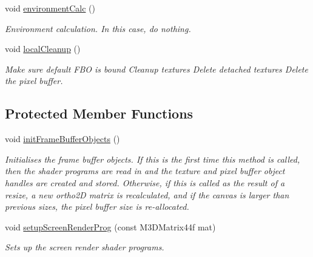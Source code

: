 \begin{DoxyCompactItemize}
void \hyperlink{class_screen_repaint_a983641dc820e4eabfb1e6b9a9966d82b}{environment\-Calc} ()
\begin{DoxyCompactList}\small\item\em Environment calculation. In this case, do nothing. \end{DoxyCompactList}\item 
void \hyperlink{class_screen_repaint_a1ef4b6395e8a5758663d57062de966fd}{local\-Cleanup} ()
\begin{DoxyCompactList}\small\item\em Make sure default F\-B\-O is bound Cleanup textures Delete detached textures Delete the pixel buffer. \end{DoxyCompactList}\end{DoxyCompactItemize}
\subsection*{Protected Member Functions}
\begin{DoxyCompactItemize}
\item 
void \hyperlink{class_screen_repaint_a49e16becb8912de9898f6fd423289093}{init\-Frame\-Buffer\-Objects} ()
\begin{DoxyCompactList}\small\item\em Initialises the frame buffer objects. If this is the first time this method is called, then the shader programs are read in and the texture and pixel buffer object handles are created and stored. Otherwise, if this is called as the result of a resize, a new ortho2\-D matrix is recalculated, and if the canvas is larger than previous sizes, the pixel buffer size is re-\/allocated. \end{DoxyCompactList}\item 
void \hyperlink{class_screen_repaint_a7b26ae89de772e886010fbbdaee0fbc6}{setup\-Screen\-Render\-Prog} (const M3\-D\-Matrix44f mat)
\begin{DoxyCompactList}\small\item\em Sets up the screen render shader programs. \end{DoxyCompactList}\end{DoxyCompactItemize}
